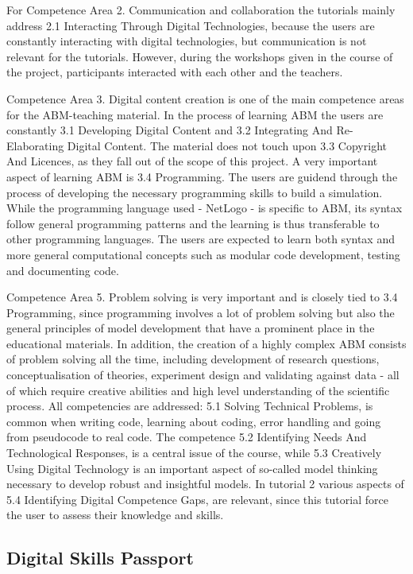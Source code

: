 \documentclass[
]{article}
\begin{document}
For Competence Area 2. Communication and collaboration the tutorials mainly address 2.1 Interacting Through Digital Technologies, because the users are constantly interacting with digital technologies, but communication is not relevant for the tutorials. However, during the workshops given in the course of the project, participants interacted with each other and the teachers.

Competence Area 3. Digital content creation is one of the main competence areas for the ABM-teaching material. In the process of learning ABM the users are constantly 3.1 Developing Digital Content and 3.2 Integrating And Re-Elaborating Digital Content. The material does not touch upon 3.3 Copyright And Licences, as they fall out of the scope of this project. A very important aspect of learning ABM is 3.4 Programming. The users are guidend through the process of developing the necessary programming skills to build a simulation. While the programming language used - NetLogo - is specific to ABM, its syntax follow general programming patterns and the learning is thus transferable to other programming languages. The users are expected to learn both syntax and more general computational concepts such as modular code development, testing and documenting code.

Competence Area 5. Problem solving is very important and is closely tied to 3.4 Programming, since programming involves a lot of problem solving but also the general principles of model development that have a prominent place in the educational materials. In addition, the creation of a highly complex ABM consists of problem solving all the time, including development of research questions, conceptualisation of theories, experiment design and validating against data - all of which require creative abilities and high level understanding of the scientific process. All competencies are addressed: 5.1 Solving Technical Problems, is common when writing code, learning about coding, error handling and going from pseudocode to real code. The competence 5.2 Identifying Needs And Technological Responses, is a central issue of the course, while 5.3 Creatively Using Digital Technology is an important aspect of so-called model thinking necessary to develop robust and insightful models. In tutorial 2 various aspects of 5.4 Identifying Digital Competence Gaps, are relevant, since this tutorial force the user to assess their knowledge and skills.

\hypertarget{digital-skills-passport}{%
\subsection{Digital Skills Passport}\label{digital-skills-passport}}
\end{document}
